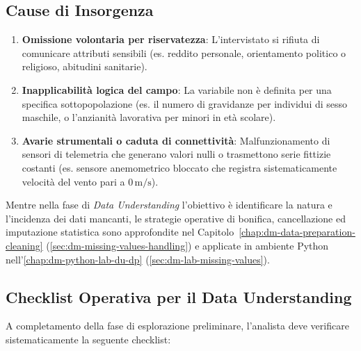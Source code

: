 \subsection{Cause di Insorgenza}
\begin{enumerate}
    \item \textbf{Omissione volontaria per riservatezza}: L'intervistato si rifiuta di comunicare attributi sensibili (es. reddito personale, orientamento politico o religioso, abitudini sanitarie).
    \item \textbf{Inapplicabilità logica del campo}: La variabile non è definita per una specifica sottopopolazione (es. il numero di gravidanze per individui di sesso maschile, o l'anzianità lavorativa per minori in età scolare).
    \item \textbf{Avarie strumentali o caduta di connettività}: Malfunzionamento di sensori di telemetria che generano valori nulli o trasmettono serie fittizie costanti (es. sensore anemometrico bloccato che registra sistematicamente velocità del vento pari a $0\,\text{m/s}$).
\end{enumerate}

Mentre nella fase di \textit{Data Understanding} l'obiettivo è identificare la natura e l'incidenza dei dati mancanti, le strategie operative di bonifica, cancellazione ed imputazione statistica sono approfondite nel Capitolo~\ref{chap:dm-data-preparation-cleaning} (\autoref{sec:dm-missing-values-handling}) e applicate in ambiente Python nell'\autoref{chap:dm-python-lab-du-dp} (\autoref{sec:dm-lab-missing-values}).

\FloatBarrier
\subsection{Checklist Operativa per il Data Understanding}

A completamento della fase di esplorazione preliminare, l'analista deve verificare sistematicamente la seguente checklist:

